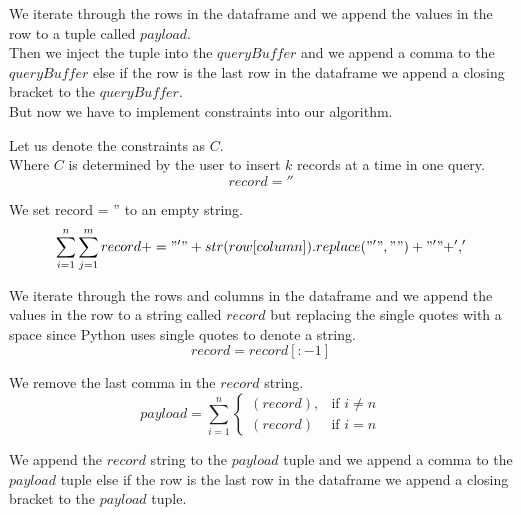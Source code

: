 We iterate through the rows in the dataframe and we append the values in the row to a tuple called $payload$. \\

Then we inject the tuple into the $queryBuffer$ and we append a comma to the $queryBuffer$ else if the row is the last row in the dataframe we append a closing bracket to the $queryBuffer$. \\
But now we have to implement constraints into our algorithm.

Let us denote the constraints as $C$. \\
Where $C$ is determined by the user to insert $k$ records at a time in one query. \\

\begin{equation}
record = ''
\end{equation}

We set record = '' to an empty string. \\

\begin{equation}
\sum_{i=1}^{n} \sum_{j=1}^{m} record+= "'"+str(row[column]).replace("'"," ")+"'" + ',' 
\end{equation}

We iterate through the rows and columns in the dataframe and we append the values in the row to a string called $record$ but replacing the single quotes with a space since Python uses single quotes to denote a string. \\

\begin{equation}
record = record[:-1]
\end{equation}

We remove the last comma in the $record$ string. \\

\begin{equation}
    payload = \sum_{i=1}^{n}
    \begin{cases}
        (record), & \text{if } i \neq n \\
        (record) & \text{if } i = n
    \end{cases}
\end{equation}

We append the $record$ string to the $payload$ tuple and we append a comma to the $payload$ tuple else if the row is the last row in the dataframe we append a closing bracket to the $payload$ tuple. \\

